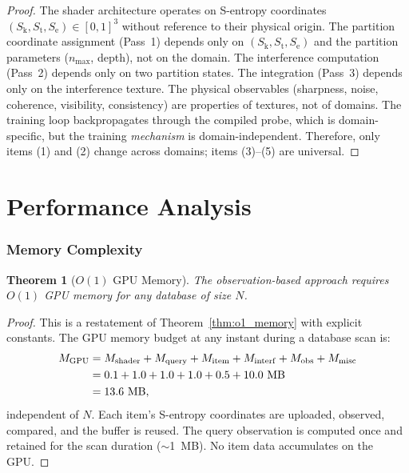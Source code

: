 \documentclass[11pt,twocolumn,a4paper]{article}
\newtheorem{theorem}{Theorem}[section]
\theoremstyle{definition}
\theoremstyle{remark}
\newcommand{\Sk}{S_{\mathrm{k}}}
\newcommand{\St}{S_{\mathrm{t}}}
\newcommand{\Se}{S_{\mathrm{e}}}
\begin{document}
\begin{proof}
The shader architecture operates on S-entropy coordinates $(\Sk, \St, \Se) \in [0,1]^3$ without reference to their physical origin. The partition coordinate assignment (Pass~1) depends only on $(\Sk, \St, \Se)$ and the partition parameters ($n_{\max}$, depth), not on the domain. The interference computation (Pass~2) depends only on two partition states. The integration (Pass~3) depends only on the interference texture. The physical observables (sharpness, noise, coherence, visibility, consistency) are properties of textures, not of domains. The training loop backpropagates through the compiled probe, which is domain-specific, but the training \emph{mechanism} is domain-independent. Therefore, only items (1) and (2) change across domains; items (3)--(5) are universal.
\end{proof}



\part{Performance Analysis}

\section{Memory Complexity}
\label{sec:memory_complexity}

\begin{theorem}[$O(1)$ GPU Memory]
\label{thm:memory_complexity}
The observation-based approach requires $O(1)$ GPU memory for any database of size $N$.
\end{theorem}

\begin{proof}
This is a restatement of Theorem~\ref{thm:o1_memory} with explicit constants. The GPU memory budget at any instant during a database scan is:
\begin{align}
M_{\mathrm{GPU}} &= M_{\mathrm{shader}} + M_{\mathrm{query}} + M_{\mathrm{item}} + M_{\mathrm{interf}} + M_{\mathrm{obs}} + M_{\mathrm{misc}} \notag \\
&= 0.1 + 1.0 + 1.0 + 1.0 + 0.5 + 10.0 \text{ MB} \notag \\
&= 13.6 \text{ MB}, \label{eq:memory_budget}
\end{align}
independent of $N$. Each item's S-entropy coordinates are uploaded, observed, compared, and the buffer is reused. The query observation is computed once and retained for the scan duration ($\sim$1~MB). No item data accumulates on the GPU.
\end{proof}
\end{document}
